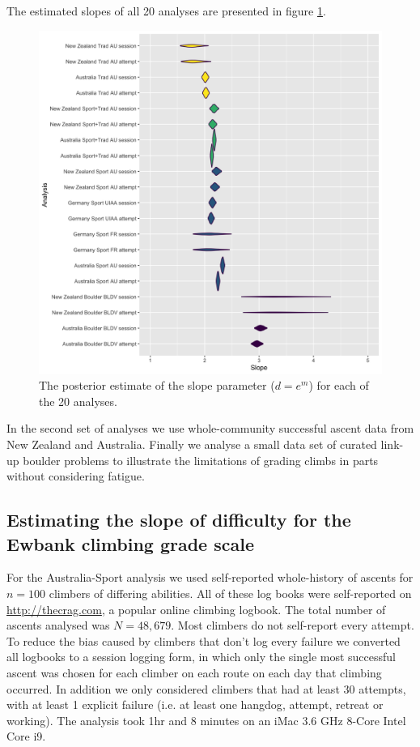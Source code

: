 \documentclass{article}
\begin{document}
The estimated slopes of all 20 analyses are presented in figure \ref{final-plot}.

\begin{figure}
\centering
\includegraphics[width=\textwidth]{../R/final-plot.png}
\caption{\small The posterior estimate of the slope parameter ($d=e^m$) for each of the 20 analyses.}
\label{final-plot}
\end{figure}

In the second set of analyses we use whole-community successful ascent data from New Zealand and Australia. Finally we analyse a small data set of curated link-up boulder problems to illustrate the limitations of grading climbs in parts without considering fatigue.

\subsection*{Estimating the slope of difficulty for the Ewbank climbing grade scale}

For the Australia-Sport analysis we used self-reported whole-history of ascents for $n=100$ climbers of differing abilities. All of these log books were self-reported on \url{http://thecrag.com}, a popular online climbing logbook. The total number of ascents analysed was $N=48,679$. Most climbers do not self-report every attempt. To reduce the bias caused by climbers that don't log every failure we converted all logbooks to a session logging form, in which only the single most successful ascent was chosen for each climber on each route on each day that climbing occurred. In addition we only considered climbers that had at least 30 attempts, with at least 1 explicit failure (i.e. at least one \gls{hangdog}, attempt, retreat or working). The analysis took 1hr and 8 minutes on an iMac 3.6 GHz 8-Core Intel Core i9.
\end{document}
